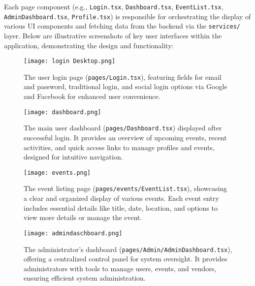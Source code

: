 \documentclass{report}
\begin{document}
Each page component (e.g., \texttt{Login.tsx}, \texttt{Dashboard.tsx}, \texttt{EventList.tsx}, \texttt{AdminDashboard.tsx}, \texttt{Profile.tsx}) is responsible for orchestrating the display of various UI components and fetching data from the backend via the \texttt{services/} layer. Below are illustrative screenshots of key user interfaces within the application, demonstrating the design and functionality:

\begin{figure}[htbp]
    \centering
    \texttt{[image: login Desktop.png]} %
    \caption{The user login page (\texttt{pages/Login.tsx}), featuring fields for email and password, traditional login, and social login options via Google and Facebook for enhanced user convenience.}
    \label{fig:user_login_page}
\end{figure}

\begin{figure}[htbp]
    \centering
    \texttt{[image: dashboard.png]} %
    \caption{The main user dashboard (\texttt{pages/Dashboard.tsx}) displayed after successful login. It provides an overview of upcoming events, recent activities, and quick access links to manage profiles and events, designed for intuitive navigation.}
    \label{fig:user_dashboard}
\end{figure}

\begin{figure}[htbp]
    \centering
    \texttt{[image: events.png]} %
    \caption{The event listing page (\texttt{pages/events/EventList.tsx}), showcasing a clear and organized display of various events. Each event entry includes essential details like title, date, location, and options to view more details or manage the event.}
    \label{fig:event_listing_page}
\end{figure}

\begin{figure}[htbp]
    \centering
    \texttt{[image: admindaschboard.png]} %
    \caption{The administrator's dashboard (\texttt{pages/Admin/AdminDashboard.tsx}), offering a centralized control panel for system oversight. It provides administrators with tools to manage users, events, and vendors, ensuring efficient system administration.}
    \label{fig:admin_dashboard}
\end{figure}
\end{document}
